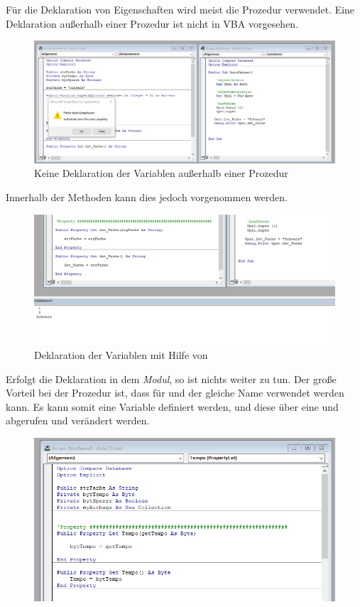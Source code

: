 Für die Deklaration von Eigenschaften wird meist die  Prozedur verwendet. Eine Deklaration außerhalb einer Prozedur ist nicht in VBA vorgesehen.
\begin{figure}[H]
	\centering
	\includegraphics[scale = 0.3]{attachment/chapter_2/Scc034}
	\caption{Keine Deklaration der Variablen außerhalb einer Prozedur}
	\label{fig:Scc034}
\end{figure} 
Innerhalb der Methoden kann dies jedoch vorgenommen werden.
\begin{figure}[H]
	\centering
	\includegraphics[scale = 0.3]{attachment/chapter_2/Scc035}
	\caption{Deklaration der Variablen mit Hilfe von }
	\label{fig:Scc035}
\end{figure} 
Erfolgt die Deklaration in dem \textit{Modul}, so ist nichts weiter zu tun. 
Der große Vorteil bei der  Prozedur ist, dass für  und  der gleiche Name verwendet werden kann. 
Es kann somit eine  Variable definiert werden, und diese über eine  und  abgerufen und verändert werden. 

\begin{figure}[H]
	\centering
	\includegraphics[scale = 0.3]{attachment/chapter_2/Scc040}
	\caption{}
	\label{fig:Scc040}
\end{figure}

